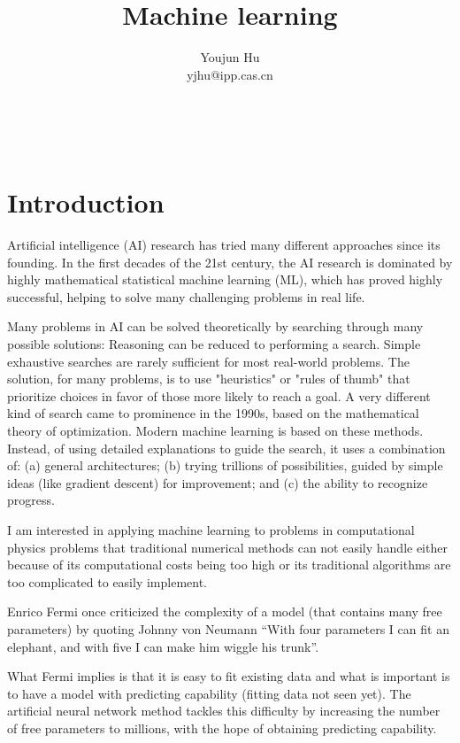 \documentclass{article}
\newcommand{\tmaffiliation}[1]{\\ #1}
\begin{document}
\title{Machine learning}

\author{
  Youjun Hu
  \tmaffiliation{yjhu@ipp.cas.cn}
}

\maketitle

\

\section{Introduction}

Artificial intelligence (AI) research has tried many different approaches
since its founding. In the first decades of the 21st century, the AI research
is dominated by highly mathematical statistical machine learning (ML), which
has proved highly successful, helping to solve many challenging problems in
real life.

Many problems in AI can be solved theoretically by searching through many
possible solutions: Reasoning can be reduced to performing a search. Simple
exhaustive searches are rarely sufficient for most real-world problems. The
solution, for many problems, is to use "heuristics" or "rules of thumb" that
prioritize choices in favor of those more likely to reach a goal. A very
different kind of search came to prominence in the 1990s, based on the
mathematical theory of optimization. Modern machine learning is based on these
methods. Instead, of using detailed explanations to guide the search, it uses
a combination of{\cite{nielsen2015neural}}: (a) general architectures; (b)
trying trillions of possibilities, guided by simple ideas (like gradient
descent) for improvement; and (c) the ability to recognize progress.

I am interested in applying machine learning to problems in computational
physics problems that traditional numerical methods can not easily handle
either because of its computational costs being too high or its traditional
algorithms are too complicated to easily implement.

Enrico Fermi once criticized the complexity of a model (that contains many
free parameters) by quoting Johnny von Neumann ``With four parameters I can
fit an elephant, and with five I can make him wiggle his trunk''.

What Fermi implies is that it is easy to fit existing data and what is
important is to have a model with predicting capability (fitting data not seen
yet). The artificial neural network method tackles this difficulty by
increasing the number of free parameters to millions, with the hope of
obtaining predicting capability.
\end{document}
